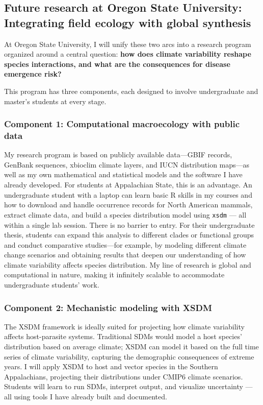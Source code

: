 \documentclass[11pt,letterpaper]{article}
\begin{document}
\subsection*{Future research at Oregon State University: Integrating field
ecology with global
synthesis}\label{future-research-at-appalachian-state-integrating-field-ecology-with-global-synthesis}

At Oregon State University, I will unify these two arcs into a research
program organized around a central question: \textbf{how does climate
variability reshape species interactions, and what are the consequences
for disease emergence risk?}

This program has three components, each designed to involve
undergraduate and master's students at every stage.

\subsubsection*{Component 1: Computational macroecology with public
data}\label{component-1-computational-macroecology-with-public-data}

My research program is based on publicly available data—GBIF records, GenBank sequences, xbioclim climate layers, and IUCN distribution maps—as well as my own mathematical and statistical models and the software I have already developed. For students at Appalachian State, this is an advantage. An undergraduate student with a laptop can learn basic R skills in my courses and how to download and handle occurrence records for North American mammals, extract climate data, and build a species distribution model using \texttt{xsdm} --- all within a single lab session. There is no barrier to entry. For their undergraduate thesis, students can expand this analysis to different clades or functional groups and conduct comparative studies—for example, by modeling different climate change scenarios and obtaining results that deepen our understanding of how climate variability affects species distribution. My line of research is global and computational in nature, making it infinitely scalable to accommodate undergraduate students' work.

\subsubsection*{Component 2: Mechanistic modeling with
XSDM}\label{component-2-mechanistic-modeling-with-xsdm}

The XSDM framework is ideally suited for projecting how climate
variability affects host-parasite systems. Traditional SDMs would model
a host species' distribution based on average climate; XSDM can model it
based on the full time series of climate variability, capturing the
demographic consequences of extreme years. I will apply XSDM to host and
vector species in the Southern Appalachians, projecting their
distributions under CMIP6 climate scenarios. Students will learn to run
SDMs, interpret output, and visualize uncertainty --- all using tools I
have already built and documented.
\end{document}
